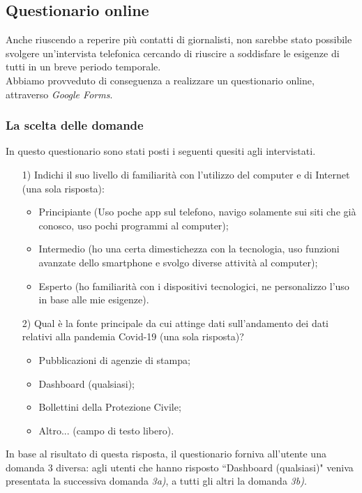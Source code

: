 \subsection{Questionario online}
Anche riuscendo a reperire più contatti di giornalisti, non sarebbe stato possibile svolgere un'intervista telefonica cercando di riuscire a soddisfare le esigenze di tutti in un breve periodo temporale.\\
Abbiamo provveduto di conseguenza a realizzare un questionario online, attraverso \textit{Google Forms}.

\subsubsection{La scelta delle domande}
In questo questionario sono stati posti i seguenti quesiti agli intervistati.
\begin{itemize}
    \item[1)] Indichi il suo livello di familiarità con l'utilizzo del computer e di Internet (una sola risposta):
    \begin{itemize}
        \item Principiante (Uso poche app sul telefono, navigo solamente sui siti che già conosco, uso pochi programmi al computer);
        \item Intermedio (ho una certa dimestichezza con la tecnologia, uso funzioni avanzate dello smartphone e svolgo diverse attività al computer);
        \item Esperto (ho familiarità con i dispositivi tecnologici, ne personalizzo l'uso in base alle mie esigenze).
    \end{itemize}
    \item[2)] Qual è la fonte principale da cui attinge dati sull'andamento dei dati relativi alla pandemia Covid-19 (una sola risposta)?
    \begin{itemize}
        \item Pubblicazioni di agenzie di stampa;
        \item Dashboard (qualsiasi);
        \item Bollettini della Protezione Civile;
        \item Altro... (campo di testo libero).
    \end{itemize}
\end{itemize}
In base al risultato di questa risposta, il questionario forniva all'utente una domanda 3 diversa: agli utenti che hanno risposto ``Dashboard (qualsiasi)" veniva presentata la successiva domanda \textit{3a)}, a tutti gli altri la domanda \textit{3b)}.
